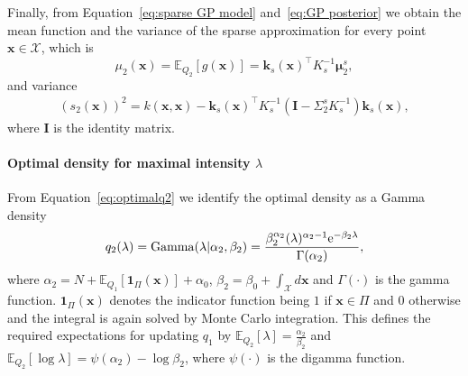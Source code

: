\documentclass[twoside,11pt]{article}
\newcommand{\EE}[2]{\mathbb{E}_{#1}\left[ #2 \right]}
\newcommand{\bs}[1]{\boldsymbol{#1}}
\newcommand{\bx}{\boldsymbol{x}}
\newcommand{\X}{\mathcal{X}}
\begin{document}
Finally, from Equation~\eqref{eq:sparse GP model} and~\eqref{eq:GP posterior} we obtain the mean function and the variance of the sparse approximation for every point $\bx\in \X$, which is 
\begin{equation}\label{eq:pred GP mean}
\mu_{2}(\bx)=\EE{Q_2}{g(\bx)} = \bs{k}_s(\bx)^\top K_s^{-1}\boldsymbol{\mu}_2^s,
\end{equation}
and variance
\begin{equation}
\begin{split}\label{eq:pred GP var}
\left(s_{2}(\bx)\right)^2 = k(\bx,\bx) - \bs{k}_s(\bx)^\top K_s^{-1}\left(\mathbf{I} - \Sigma_2^s K_s^{-1}\right)\bs{k}_s(\bx),
\end{split}
\end{equation}
where $\mathbf{I}$ is the identity matrix.

\paragraph{Optimal density for maximal intensity $\lambda$}
From Equation~\eqref{eq:optimalq2} we identify the optimal density as a Gamma density
\begin{equation}\label{eq:optimal lambda density}
q_2(\lambda) = \rm{Gamma}(\lambda\vert \alpha_{2}, \beta_{2}) = \frac{\beta_{2}^{\alpha_{2}}(\lambda)^{\alpha_{2}-1}e^{-\beta_{2}\lambda}}{\Gamma(\alpha_{2})},
\end{equation}
where $\alpha_{2}= N + \EE{Q_1}{\boldsymbol{1}_{\Pi}(\bx)} + \alpha_0$, $\beta_{2}=\beta_0 + \int_\X d\bx$ and $\Gamma(\cdot)$ is the gamma function. $\boldsymbol{1}_{\Pi}(\bx)$ denotes the indicator function being $1$ if $\bx\in \Pi$ and $0$ otherwise and the integral is again solved by Monte Carlo integration. This defines the required expectations for updating $q_1$ by $\EE{Q_2}{\lambda} = \frac{\alpha_{2}}{\beta_{2}}$ and 
$\EE{Q_2}{\log\lambda} = \psi(\alpha_{2}) - \log \beta_{2}$,
where $\psi(\cdot)$ is the digamma function.
\end{document}
